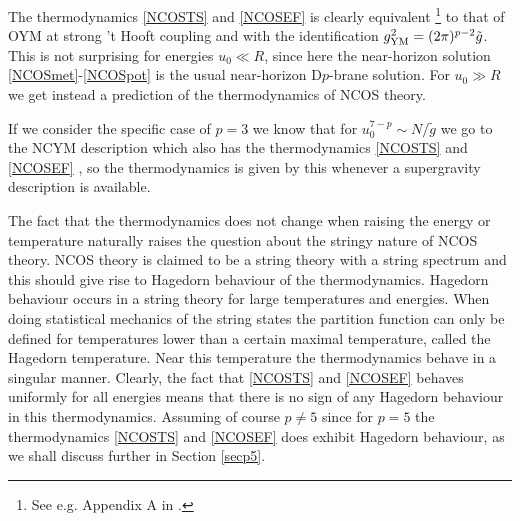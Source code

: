 \documentclass[a4paper,twoside,titlepage,12pt]{article}
\begin{document}
The thermodynamics \eqref{NCOSTS} and \eqref{NCOSEF} is clearly equivalent%
\footnote{See e.g. Appendix A in \cite{Harmark:1999xt}.}
to that of OYM at strong 't Hooft coupling and
with the identification $g_{\mathrm{YM}}^2 = (2\pi)^{p-2} \tilde{g}$.
This is not surprising for energies \( u_0 \ll R \), since here
the near-horizon solution \eqref{NCOSmet}-\eqref{NCOSpot} 
is the usual near-horizon D$p$-brane solution.
For $u_0 \gg R$ we get instead a prediction of the thermodynamics of
NCOS theory. 

If we consider the specific case of $p=3$ we know that
for \( u_0^{7-p} \sim N/\tilde{g} \) we go to the NCYM description
which also has the thermodynamics \eqref{NCOSTS} and \eqref{NCOSEF}
\cite{Maldacena:1999mh}, so the thermodynamics is given by this whenever
a supergravity description is available.

The fact that the thermodynamics does not change when raising
the energy or temperature naturally raises the question 
about the stringy nature of NCOS theory. 
NCOS theory is claimed to be a string theory with a string spectrum and this
should give rise to Hagedorn behaviour of the thermodynamics.
Hagedorn behaviour occurs in a string theory for large temperatures
and energies. When doing statistical mechanics
of the string states the partition function can only be defined for
temperatures lower than a certain maximal temperature, called the 
Hagedorn temperature. Near this temperature the thermodynamics behave
in a singular manner.
Clearly, the fact that \eqref{NCOSTS} and \eqref{NCOSEF} behaves
uniformly for all energies means that there is no sign of any Hagedorn
behaviour in this thermodynamics. Assuming of course $p \neq 5$
since for $p=5$ the thermodynamics \eqref{NCOSTS} and \eqref{NCOSEF}
does exhibit Hagedorn behaviour, as we shall discuss further in 
Section \ref{secp5}.
\end{document}
